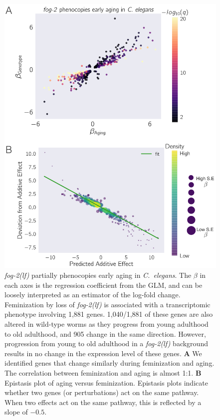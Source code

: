 \documentclass[10pt,letterpaper,twocolumn]{article}
\newcommand{\cel}{\emph{C.~elegans}}
\newcommand{\fog}{\emph{\mbox{fog-2(lf)}}}
\newcommand{\fogn}{1,881}
\newcommand{\coexpressed}{905}
\newcommand{\intersectn}{1,040}
\begin{document}
\begin{figure}
\renewcommand{\familydefault}{\sfdefault}\normalfont{}
\centering
\includegraphics[width=\linewidth]{../../output/figs/final_figs/aberrant_aging.pdf}
\caption{
\fog{} partially phenocopies early aging in \cel{}. The $\beta$ in
each axes is the regression coefficient from the GLM, and can be loosely
interpreted as an estimator of the log-fold change.
Feminization by loss of \fog{} is associated with a transcriptomic phenotype
involving \fogn{} genes. \intersectn{}/\fogn{} of these genes are also altered
in wild-type worms as they progress from young adulthood to old adulthood, and
\coexpressed{} change in the same direction. However, progression from young to
old adulthood in a \fog{} background results in no change in the expression
level of these genes.
\textbf{A} We identified genes that change similarly during feminization and aging.
The correlation between feminization and aging is almost 1:1.
\textbf{B} Epistasis plot of aging versus feminization. Epistasis plots indicate
whether two genes (or perturbations) act on the same pathway. When two effects act
on the same pathway, this is reflected by a slope of $-0.5$.
}%
\label{fig:aberrant_aging}
\end{figure}
\end{document}
